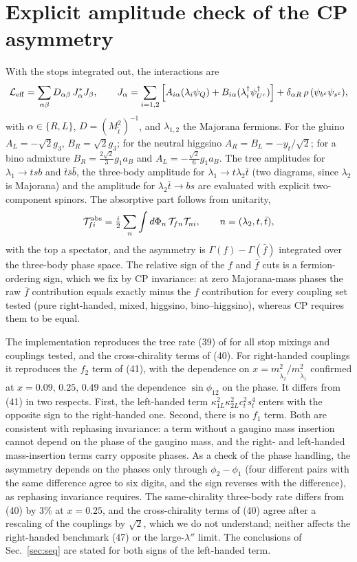 \documentclass[11pt]{article}
\begin{document}
\section{Explicit amplitude check of the CP asymmetry}\label{app:amp}
With the stops integrated out, the interactions are
\begin{equation}
\mathcal L_{\rm eff}=\sum_{\alpha\beta}D_{\alpha\beta}\,J_\alpha^*J_\beta,\qquad
J_\alpha=\sum_{i=1,2}\Big[A_{i\alpha}(\lambda_i\psi_Q)+B_{i\alpha}(\lambda_i^\dagger\psi_{U^c}^\dagger)\Big]+\delta_{\alpha R}\,\rho\,(\psi_{b^c}\psi_{s^c}),
\end{equation}
with $\alpha\in\{R,L\}$, $D=(M^2_{\tilde t})^{-1}$, and $\lambda_{1,2}$ the Majorana fermions. For the gluino $A_L=-\sqrt2g_3$, $B_R=\sqrt2g_3$; for the neutral higgsino $A_R=B_L=-y_t/\sqrt2$; for a bino admixture $B_R=\tfrac{2\sqrt2}{3}g_1a_B$ and $A_L=-\tfrac{\sqrt2}{6}g_1a_B$. The tree amplitudes for $\lambda_1\to tsb$ and $\bar t\bar s\bar b$, the three-body amplitude for $\lambda_1\to t\lambda_2\bar t$ (two diagrams, since $\lambda_2$ is Majorana) and the amplitude for $\lambda_2\bar t\to bs$ are evaluated with explicit two-component spinors. The absorptive part follows from unitarity,
\begin{equation}
\mathcal T^{\rm abs}_{fi}=\tfrac{i}{2}\sum_n\int d\Phi_n\,\mathcal T_{fn}\mathcal T_{ni},\qquad n=(\lambda_2,t,\bar t),
\end{equation}
with the top a spectator, and the asymmetry is $\Gamma(f)-\Gamma(\bar f)$ integrated over the three-body phase space. The relative sign of the $f$ and $\bar f$ cuts is a fermion-ordering sign, which we fix by CP invariance: at zero Majorana-mass phases the raw $\bar f$ contribution equals exactly minus the $f$ contribution for every coupling set tested (pure right-handed, mixed, higgsino, bino--higgsino), whereas CP requires them to be equal.

The implementation reproduces the tree rate (39) of \cite{KW} for all stop mixings and couplings tested, and the cross-chirality terms of (40). For right-handed couplings it reproduces the $f_2$ term of (41), with the dependence on $x=m_{\tilde\lambda_2}^2/m_{\tilde\lambda_1}^2$ confirmed at $x=0.09,\,0.25,\,0.49$ and the dependence $\sin\phi_{12}$ on the phase. It differs from (41) in two respects. First, the left-handed term $\kappa_{1L}^2\kappa_{2L}^2c_t^2s_t^4$ enters with the opposite sign to the right-handed one. Second, there is no $f_1$ term. Both are consistent with rephasing invariance: a term without a gaugino mass insertion cannot depend on the phase of the gaugino mass, and the right- and left-handed mass-insertion terms carry opposite phases. As a check of the phase handling, the asymmetry depends on the phases only through $\phi_2-\phi_1$ (four different pairs with the same difference agree to six digits, and the sign reverses with the difference), as rephasing invariance requires. The same-chirality three-body rate differs from (40) by $3\%$ at $x=0.25$, and the cross-chirality terms of (40) agree after a rescaling of the couplings by $\sqrt2$, which we do not understand; neither affects the right-handed benchmark (47) or the large-$\lambda''$ limit. The conclusions of Sec.~\ref{sec:seq} are stated for both signs of the left-handed term.
\end{document}
